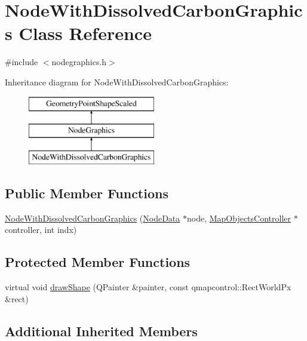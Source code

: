 \hypertarget{class_node_with_dissolved_carbon_graphics}{}\section{Node\+With\+Dissolved\+Carbon\+Graphics Class Reference}
\label{class_node_with_dissolved_carbon_graphics}


{\ttfamily \#include $<$nodegraphics.\+h$>$}

Inheritance diagram for Node\+With\+Dissolved\+Carbon\+Graphics\+:\begin{figure}[H]
\begin{center}
\leavevmode
\includegraphics[height=3.000000cm]{d9/d54/class_node_with_dissolved_carbon_graphics}
\end{center}
\end{figure}
\subsection*{Public Member Functions}
\begin{DoxyCompactItemize}
\item 
\mbox{\hyperlink{class_node_with_dissolved_carbon_graphics_a2cff6dd2fd7d856a5074ef4f4b7c9127}{Node\+With\+Dissolved\+Carbon\+Graphics}} (\mbox{\hyperlink{class_node_data}{Node\+Data}} $\ast$node, \mbox{\hyperlink{class_map_objects_controller}{Map\+Objects\+Controller}} $\ast$controller, int indx)
\end{DoxyCompactItemize}
\subsection*{Protected Member Functions}
\begin{DoxyCompactItemize}
\item 
virtual void \mbox{\hyperlink{class_node_with_dissolved_carbon_graphics_a98cde82efaa972b0a66620bff648cfbe}{draw\+Shape}} (Q\+Painter \&painter, const qmapcontrol\+::\+Rect\+World\+Px \&rect)
\end{DoxyCompactItemize}
\subsection*{Additional Inherited Members}


